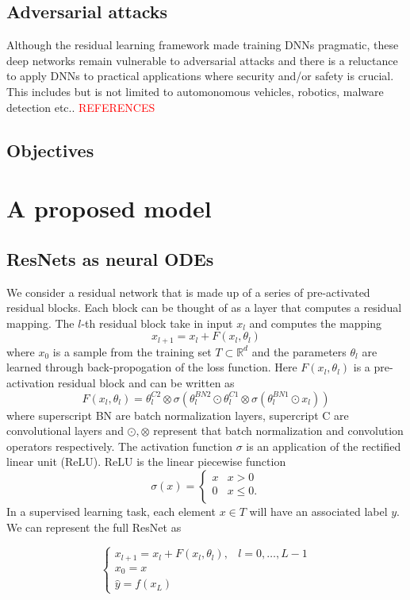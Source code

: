 \documentclass[12pt]{article}
\begin{document}
\subsection{Adversarial attacks}
Although the residual learning framework made training DNNs pragmatic, these deep networks remain vulnerable to adversarial attacks and there is a reluctance to apply DNNs to practical applications where security and/or safety is crucial. This includes but is not limited to automonomous vehicles, robotics, malware detection etc.. \textcolor{red}{REFERENCES}
\subsection{Objectives}
\section{A proposed model}
\subsection{ResNets as neural ODEs}
We consider a residual network that is made up of a series of pre-activated residual blocks. Each block can be thought of as a layer that computes a residual mapping. The $l$-th residual block take in input $x_l$ and computes the mapping
$$ x_{l+1} = x_{l} + F(x_l,\theta_l)$$
where $x_0$ is a sample from the training set $T \subset \mathbb{R}^d $ and the parameters $\theta_l$ are learned through back-propogation of the loss function. Here $F(x_l,\theta_l)$ is a pre-activation residual block and can be written as
$$ F(x_l,\theta_l) =  \theta_l^{C2}\otimes\sigma(\theta_l^{BN2}\odot\theta_l^{C1}\otimes\sigma(\theta_l^{BN1}\odot x_l))$$
where superscript BN are batch normalization layers, supercript C are convolutional layers and $\odot, \otimes$ represent that batch normalization and convolution operators respectively. The activation function $\sigma$ is an application of the rectified linear unit (ReLU). ReLU is the linear piecewise function
\begin{equation*}
\sigma(x) = \begin{cases} x & x > 0 \\
 0 & x \leq 0. \\
\end{cases}
\end{equation*}
In a supervised learning task, each element $x \in T$ will have an associated label $y$. We can represent the full ResNet as

\begin{equation} \begin{cases}
x_{l+1} = x_l + F(x_l,\theta_l), & l=0,\dots,L-1 \\
x_0 = x \\
\hat y = f(x_L)
\end{cases}
\label{eq:sys}
\end{equation}
\end{document}
